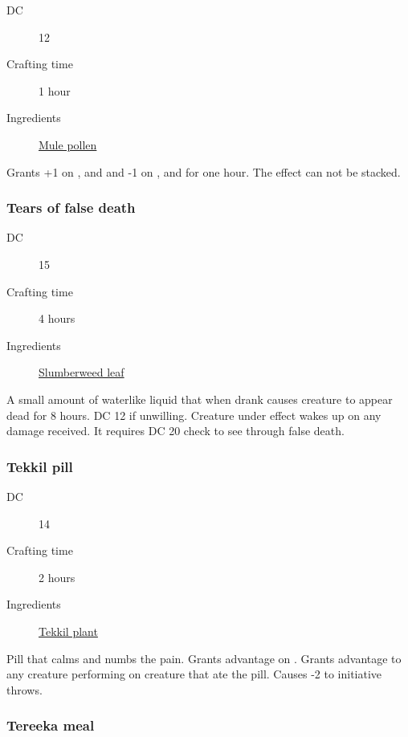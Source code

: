 \begin{description}
\item [DC] 12 \survival
\item [Crafting time] 1 hour
\item [Ingredients] \hyperref[Mule Pollen]{Mule pollen}
\end{description}

Grants +1 on \strength, \dexterity and \constitution and -1 on \intelligence, \wisdom and \charisma{} for one hour. The effect can not be stacked.

\subsubsection{Tears of false death}
\label{Tears of false death}

\begin{description}
\item [DC] 15 \medicine
\item [Crafting time] 4 hours
\item [Ingredients] \hyperref[Slumberweed]{Slumberweed leaf}
\end{description}

A small amount of waterlike liquid that when drank causes creature to appear dead for 
8 hours. DC 12 \constitutionsave if unwilling. Creature under effect wakes up on any damage received. 
It requires DC 20 \medicine check to see through false death.

\subsubsection{Tekkil pill}
\label{Tekkil pill}

\begin{description}
\item [DC] 14 \medicine
\item [Crafting time] 2 hours
\item [Ingredients] \hyperref[Tekkil]{Tekkil plant}
\end{description}

Pill that calms and numbs the pain. Grants advantage on \constitutionsave. 
Grants advantage to any creature performing \medicine on creature that ate the pill. 
Causes -2 to initiative throws.

\subsubsection{Tereeka meal}
\label{Tereeka meal}

